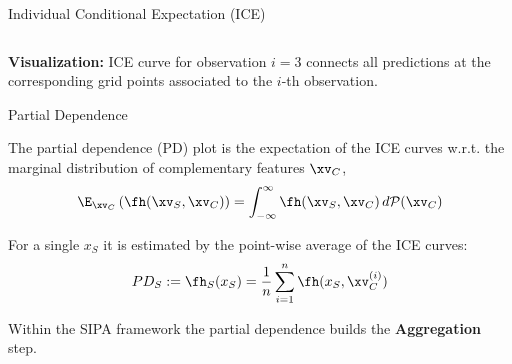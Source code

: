 \documentclass[11pt,compress,t,notes=noshow, xcolor=table]{beamer}
\begin{document}
\begin{vbframe}{Individual Conditional Expectation (ICE)}
\begin{onlyenv}
\begin{columns}[T]
\begin{column}{0.5\textwidth}
\end{column}
\end{columns}
\end{onlyenv}

\textbf{Visualization:} ICE curve for observation $i=3$ connects all predictions at the corresponding grid points associated to the $i$-th observation.
\end{vbframe}


\begin{vbframe}{Partial Dependence}

The partial dependence (PD) plot is the expectation of the ICE curves w.r.t. the marginal distribution of complementary features $\xv_C$,
$$\E_{\xv_C} \left( \fh(\xv_S, \xv_C) \right) = \int_{-\infty}^{\infty} \fh(\xv_S, \xv_C) \, d\mathcal{P}(\xv_C)$$

For a single $x_S$ it is estimated by the point-wise average of the ICE curves:
$$PD_S := \fh_{S}(x_S) = \frac{1}{n} \sum_{i=1}^n \fh(x_S, \xv_C^{(i)})$$

Within the SIPA framework the partial dependence builds the \textbf{Aggregation} step.

\end{vbframe}
\end{document}
